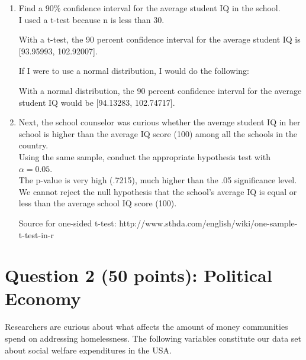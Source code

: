 \documentclass[12pt,letterpaper]{article}
\begin{document}
\begin{enumerate}
	\item Find a 90\% confidence interval for the average student IQ in the school.\\
	
I used a t-test because n is less than 30.

  

With a t-test, the 90 percent confidence interval for the average student IQ is [93.95993, 102.92007].

If I were to use a normal distribution, I would do the following:



With a normal distribution, the 90 percent confidence interval for the average student IQ would be [94.13283, 102.74717].\\
	
	\item Next, the school counselor was curious  whether  the average student IQ in her school is higher than the average IQ score (100) among all the schools in the country.\\ 
	
	\noindent Using the same sample, conduct the appropriate hypothesis test with $\alpha=0.05$.\\



The p-value is very high (.7215), much higher than the .05 significance level. We cannot reject the null hypothesis that the school's average IQ is equal or less than the average school IQ score (100).

Source for one-sided t-test: http://www.sthda.com/english/wiki/one-sample-t-test-in-r


\end{enumerate}

\newpage

	\section*{Question 2 (50 points): Political Economy}

\noindent Researchers are curious about what affects the amount of money communities spend on addressing homelessness. The following variables constitute our data set about social welfare expenditures in the USA. \\
\vspace{.5cm}
\end{document}
